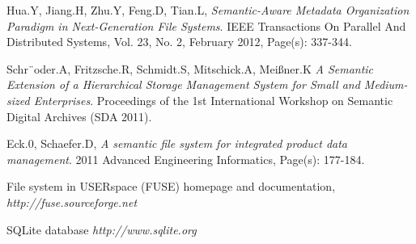 \begin{thebibliography}{99}
Hua.Y, Jiang.H, Zhu.Y, Feng.D, Tian.L,
\emph{Semantic-Aware Metadata Organization Paradigm in Next-Generation File Systems}.
IEEE Transactions On Parallel And Distributed Systems, 
Vol. 23, No. 2, February 2012, Page(s): 337-344.

Schr¨oder.A, Fritzsche.R, Schmidt.S, Mitschick.A, Meißner.K 
\emph {A Semantic Extension of a Hierarchical Storage Management System for Small and Medium-sized Enterprises}.
Proceedings of the 1st International Workshop on Semantic Digital Archives (SDA 2011).

Eck.0, Schaefer.D, 
\emph{A semantic file system for integrated product data management}.
2011 Advanced Engineering Informatics, Page(s): 177-184.

File system in USERspace (FUSE) homepage and documentation, 
\emph{http://fuse.sourceforge.net}

SQLite database
\emph{http://www.sqlite.org}

\end{thebibliography}

